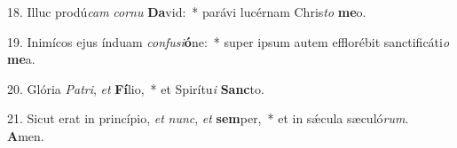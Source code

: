 18. Illuc prodú\textit{cam} \textit{cor}\textit{nu} \textbf{Da}vid:~*  parávi lucérnam Chris\textit{to} \textbf{me}o.\

19. Inimícos ejus índuam \textit{con}\textit{fu}\textit{si}\textbf{ó}ne:~*  super ipsum autem efflorébit sanctificáti\textit{o} \textbf{me}a.\

20. Glória \textit{Pa}\textit{tri}, \textit{et} \textbf{Fí}lio,~*  et Spirítu\textit{i} \textbf{Sanc}to.\

21. Sicut erat in princípio, \textit{et} \textit{nunc}, \textit{et} \textbf{sem}per,~*  et in sǽcula sæculó\textit{rum}. \textbf{A}men.\


